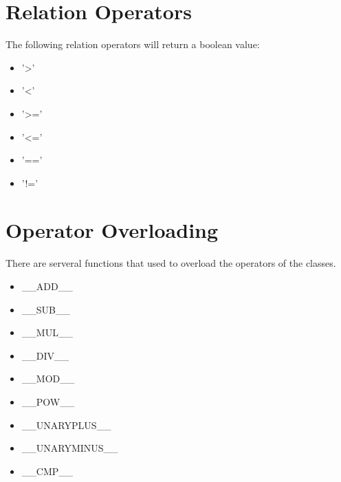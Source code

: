 \section{Relation Operators}
The following relation operators will return a boolean value:
\begin{itemize}
	\item '>'
	\item '<'
	\item '>='
	\item '<='
	\item '=='
	\item '!='
\end{itemize}
\section{Operator Overloading}
There are serveral functions that used to overload the operators of the classes.
\begin{itemize}
	\item \_\_ADD\_\_
	\item \_\_SUB\_\_
	\item \_\_MUL\_\_
	\item \_\_DIV\_\_
	\item \_\_MOD\_\_
	\item \_\_POW\_\_
	\item \_\_UNARYPLUS\_\_
	\item \_\_UNARYMINUS\_\_
	\item \_\_CMP\_\_
\end{itemize}

